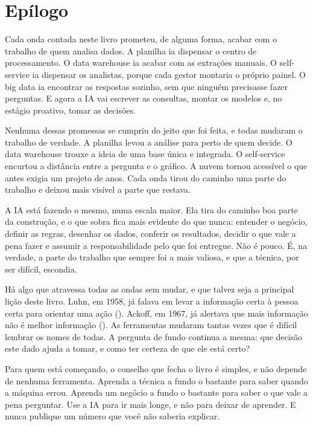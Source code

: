 \chapter*{Epílogo}
\label{cap:epilogo}

Cada onda contada neste livro prometeu, de alguma forma, acabar com o trabalho de quem analisa
dados. A planilha ia dispensar o centro de processamento. O data warehouse ia acabar com as
extrações manuais. O self-service ia dispensar os analistas, porque cada gestor montaria o
próprio painel. O big data ia encontrar as respostas sozinho, sem que ninguém precisasse fazer
perguntas. E agora a IA vai escrever as consultas, montar os modelos e, no estágio proativo,
tomar as decisões.

Nenhuma dessas promessas se cumpriu do jeito que foi feita, e todas mudaram o trabalho de
verdade. A planilha levou a análise para perto de quem decide. O data warehouse trouxe a ideia de
uma base única e integrada. O self-service encurtou a distância entre a pergunta e o gráfico. A
nuvem tornou acessível o que antes exigia um projeto de anos. Cada onda tirou do caminho uma parte
do trabalho e deixou mais visível a parte que restava.

A IA está fazendo o mesmo, numa escala maior. Ela tira do caminho boa parte da construção, e o
que sobra fica mais evidente do que nunca: entender o negócio, definir as regras, desenhar os
dados, conferir os resultados, decidir o que vale a pena fazer e assumir a responsabilidade pelo
que foi entregue. Não é pouco. É, na verdade, a parte do trabalho que sempre foi a mais valiosa, e
que a técnica, por ser difícil, escondia.

Há algo que atravessa todas as ondas sem mudar, e que talvez seja a principal lição deste livro.
Luhn, em 1958, já falava em levar a informação certa à pessoa certa para orientar uma ação
(). Ackoff, em 1967, já alertava que mais informação não é melhor informação
(). As ferramentas mudaram tantas vezes que é difícil lembrar os nomes de todas. A
pergunta de fundo continua a mesma: que decisão este dado ajuda a tomar, e como ter certeza de que
ele está certo?


Para quem está começando, o conselho que fecha o livro é simples, e não depende de nenhuma
ferramenta. Aprenda a técnica a fundo o bastante para saber quando a máquina errou. Aprenda um
negócio a fundo o bastante para saber o que vale a pena perguntar. Use a IA para ir mais longe, e
não para deixar de aprender. E nunca publique um número que você não saberia explicar.

